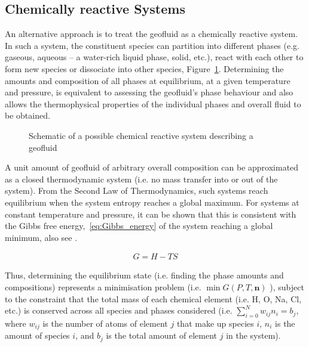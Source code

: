 \subsection{Chemically reactive Systems}
\label{sec:chemically_active_system}
    An alternative approach is to treat the geofluid as a chemically reactive system. In such a system, the constituent species can partition into different phases (e.g. gaseous, aqueous – a water-rich liquid phase, solid, etc.), react with each other to form new species or dissociate into other species, Figure~\ref{fig:chemically_reactive_system}. Determining the amounts and composition of all phases at equilibrium, at a given temperature and pressure, is equivalent to assessing the geofluid’s phase behaviour and also allows the thermophysical properties of the individual phases and overall fluid to be obtained.

    \begin{figure}[H]
        \centering
        
        \caption{Schematic of a possible chemical reactive system describing a geofluid}
        \label{fig:chemically_reactive_system}
    \end{figure}

    A unit amount of geofluid of arbitrary overall composition can be approximated as a closed thermodynamic system (i.e. no mass transfer into or out of the system). From the Second Law of Thermodynamics, such systems reach equilibrium when the system entropy reaches a global maximum. For systems at constant temperature and pressure, it can be shown that this is consistent with the Gibbs free energy,~\ref{eq:Gibbs_energy} of the system reaching a global minimum, also see .

    \begin{align}
        G = H - TS \label{eq:Gibbs_energy}
    \end{align}

    Thus, determining the equilibrium state (i.e. finding the phase amounts and compositions) represents a minimisation problem (i.e. \(\min G(P, T, \mathbf{n}) \) ), subject to the constraint that the total mass of each chemical element (i.e. H, O, Na, Cl, etc.) is conserved across all species and phases considered (i.e. \(\sum_{i=0}^N w_{ij} n_i = b_j\), where \(w_{ij} \) is the number of atoms of element \(j\) that make up species \(i\), \(n_i\) is the amount of species \(i\), and \(b_j\) is the total amount of element \(j\) in the system).

